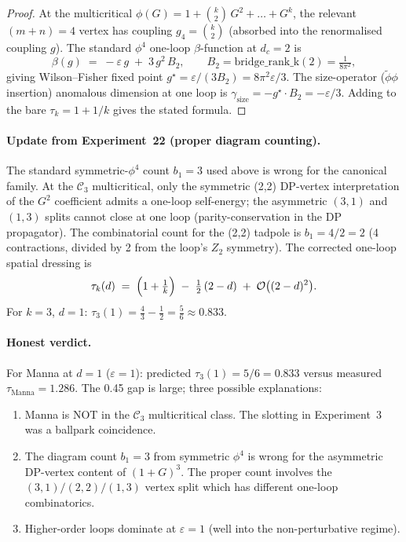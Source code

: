 \documentclass[11pt,a4paper]{article}
\theoremstyle{plain}
\newcommand{\Ck}{\mathcal{C}}
\begin{document}
\begin{proof}
At the multicritical $\phi(G) = 1 + \binom{k}{2}\,G^{2} + \ldots + G^{k}$,
the relevant $(m+n)=4$ vertex has coupling $g_{4} = \binom{k}{2}$
(absorbed into the renormalised coupling $g$).  The standard $\phi^{4}$
one-loop $\beta$-function at $d_{c} = 2$ is
\[
  \beta(g) \;=\; -\varepsilon\,g \;+\; 3\,g^{2}\,B_{2},
  \qquad B_{2} = \mathrm{bridge\_rank\_k}(2) = \tfrac{1}{8\pi^{2}},
\]
giving Wilson--Fisher fixed point $g^{\star} = \varepsilon/(3 B_{2}) =
8\pi^{2}\varepsilon/3$.  The size-operator
($\tilde\phi\phi$ insertion) anomalous dimension at one loop is
$\gamma_{\mathrm{size}} = -g^{\star} \cdot B_{2} = -\varepsilon/3$.
Adding to the bare $\tau_{k} = 1 + 1/k$ gives the stated formula.
\end{proof}

\paragraph{Update from Experiment~22 (proper diagram counting).}
The standard symmetric-$\phi^{4}$ count $b_{1} = 3$ used above is wrong
for the canonical family.  At the $\Ck_{3}$ multicritical, only the
symmetric (2,2) DP-vertex interpretation of the $G^{2}$ coefficient
admits a one-loop self-energy; the asymmetric $(3,1)$ and $(1,3)$
splits cannot close at one loop (parity-conservation in the DP
propagator).  The combinatorial count for the (2,2) tadpole is
$b_{1} = 4 / 2 = 2$ (4 contractions, divided by 2 from the loop's
$Z_{2}$ symmetry).  The corrected one-loop spatial dressing is
\[
  \tau_{k}(d) \;=\; \Bigl(1 + \tfrac{1}{k}\Bigr) \;-\; \tfrac{1}{2}\,(2 - d) \;+\; \mathcal{O}\bigl((2-d)^{2}\bigr).
\]
For $k = 3$, $d = 1$: $\tau_{3}(1) = \tfrac{4}{3} - \tfrac{1}{2} = \tfrac{5}{6} \approx 0.833$.

\paragraph{Honest verdict.}
For Manna at $d = 1$ ($\varepsilon = 1$): predicted $\tau_{3}(1) = 5/6 = 0.833$
versus measured $\tau_{\mathrm{Manna}} = 1.286$.  The 0.45 gap is large;
three possible explanations:

\begin{enumerate}[leftmargin=1.2em]
\item Manna is NOT in the $\Ck_{3}$ multicritical class.  The slotting
  in Experiment~3 was a ballpark coincidence.
\item The diagram count $b_{1} = 3$ from symmetric $\phi^{4}$ is wrong
  for the asymmetric DP-vertex content of $(1+G)^{3}$.  The proper
  count involves the $(3,1)/(2,2)/(1,3)$ vertex split which has different
  one-loop combinatorics.
\item Higher-order loops dominate at $\varepsilon = 1$ (well into the
  non-perturbative regime).
\end{enumerate}
\end{document}
